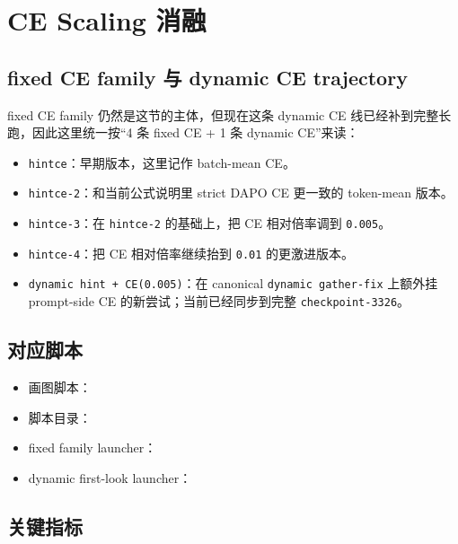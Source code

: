 \section{CE Scaling 消融}

\subsection{fixed CE family 与 dynamic CE trajectory}

fixed CE family 仍然是这节的主体，但现在这条 dynamic CE 线已经补到完整长跑，因此这里统一按“4 条 fixed CE + 1 条 dynamic CE”来读：

\begin{itemize}
\item \texttt{hintce}：早期版本，这里记作 batch-mean CE。
\item \texttt{hintce-2}：和当前公式说明里 strict DAPO CE 更一致的 token-mean 版本。
\item \texttt{hintce-3}：在 \texttt{hintce-2} 的基础上，把 CE 相对倍率调到 \texttt{0.005}。
\item \texttt{hintce-4}：把 CE 相对倍率继续抬到 \texttt{0.01} 的更激进版本。
\item \texttt{dynamic hint + CE(0.005)}：在 canonical \texttt{dynamic gather-fix} 上额外挂 prompt-side CE 的新尝试；当前已经同步到完整 \texttt{checkpoint-3326}。
\end{itemize}

\subsection{对应脚本}

{\footnotesize
\begin{itemize}
\item 画图脚本：
\item 脚本目录：
\item fixed family launcher：
\item dynamic first-look launcher：
\end{itemize}
}

\subsection{关键指标}


